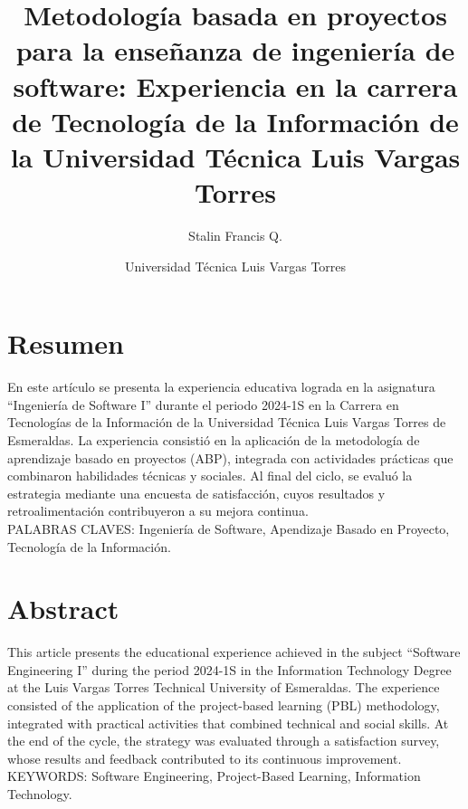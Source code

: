 \documentclass[12pt]{article}
\title{Metodología basada en proyectos para la enseñanza de ingeniería de software: Experiencia en la carrera de Tecnología de la Información de la Universidad Técnica Luis Vargas Torres}
\author{Stalin Francis Q.}
\date{Universidad Técnica Luis Vargas Torres}
\begin{document}
\maketitle


\newpage
\begin{multicols}{2}
  
\section*{Resumen}

  
  En este artículo se presenta la experiencia educativa lograda en la asignatura ``Ingeniería de Software I'' durante el periodo 2024-1S en la Carrera en Tecnologías de la Información de la  Universidad Técnica Luis Vargas Torres de Esmeraldas. La experiencia consistió en la aplicación de la  metodología de aprendizaje basado en proyectos (ABP), integrada con actividades prácticas que combinaron habilidades técnicas y sociales. Al final del ciclo, se evaluó la estrategia mediante una encuesta de satisfacción, cuyos resultados y retroalimentación  contribuyeron  a su  mejora continua.\\



 
  PALABRAS CLAVES: Ingeniería de Software, Apendizaje Basado en Proyecto, Tecnología de la Información.
  
\section*{Abstract}

This article presents the educational experience achieved in the subject “Software Engineering I” during the period 2024-1S in the Information Technology Degree at the Luis Vargas Torres Technical University of Esmeraldas. The experience consisted of the application of the project-based learning (PBL) methodology, integrated
with practical activities that combined technical and social skills. At the end of the cycle, the strategy was evaluated through a satisfaction survey, whose results and feedback contributed to its continuous improvement.\\


  KEYWORDS: Software Engineering, Project-Based Learning, Information Technology.

              







\end{multicols}
\end{document}
